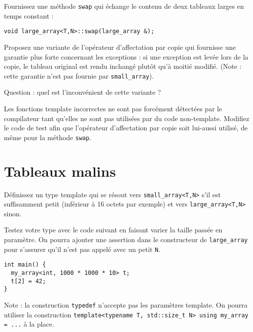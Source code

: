 \documentclass[a4paper]{article}
\begin{document}
Fournissez une méthode \lstinline|swap| qui échange le contenu de deux
tableaux larges en temps constant :
\begin{lstlisting}
void large_array<T,N>::swap(large_array &);
\end{lstlisting}

Proposez une variante de l'opérateur d'affectation par copie qui
fournisse une garantie plus forte concernant les exceptions : si une
exception est levée lors de la copie, le tableau original est rendu
inchangé plutôt qu'à moitié modifié. (Note : cette garantie n'est pas
fournie par \lstinline|small_array|).

Question : quel est l'inconvénient de cette variante ?

Les fonctions template incorrectes ne sont pas forcément détectées par le
compilateur tant qu'elles ne sont pas utilisées par du code
non-template. Modifiez le code de test afin que l'opérateur d'affectation
par copie soit lui-aussi utilisé, de même pour la méthode
\lstinline|swap|.

\section{Tableaux malins}

Définissez un type template qui se résout vers
\lstinline|small_array<T,N>| s'il est suffisamment petit (inférieur à 16
octets par exemple) et vers \lstinline|large_array<T,N>| sinon.

Testez votre type avec le code suivant en faisant varier la taille passée
en paramètre. On pourra ajouter une assertion dans le constructeur de
\lstinline|large_array| pour s'assurer qu'il n'est pas appelé avec un
petit \lstinline|N|.
\begin{lstlisting}
int main() {
  my_array<int, 1000 * 1000 * 10> t;
  t[2] = 42;
}
\end{lstlisting}

Note : la construction \lstinline|typedef| n'accepte pas les paramètres
template. On pourra utiliser la construction
\lstinline|template<typename T, std::size_t N> using my_array = ...|
à la place.
\end{document}
